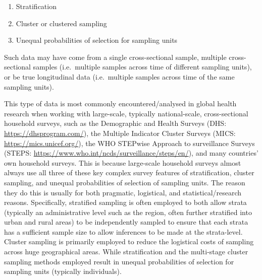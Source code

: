 \documentclass[
]{book}
\begin{document}
\begin{enumerate}
\def\labelenumi{\arabic{enumi}.}
\item
  Stratification
\item
  Cluster or clustered sampling
\item
  Unequal probabilities of selection for sampling units
\end{enumerate}

Such data may have come from a single cross-sectional sample, multiple cross-sectional samples (i.e.~multiple samples across time of different sampling units), or be true longitudinal data (i.e.~multiple samples across time of the same sampling units).

This type of data is most commonly encountered/analysed in global health research when working with large-scale, typically national-scale, cross-sectional household surveys, such as the Demographic and Health Surveys (DHS: \url{https://dhsprogram.com/}), the Multiple Indicator Cluster Surveys (MICS: \url{https://mics.unicef.org/}), the WHO STEPwise Approach to surveillance Surveys (STEPS: \url{https://www.who.int/ncds/surveillance/steps/en/}), and many countries' own household surveys. This is because large-scale household surveys almost always use all three of these key complex survey features of stratification, cluster sampling, and unequal probabilities of selection of sampling units. The reason they do this is usually for both pragmatic, logistical, and statistical/research reasons. Specifically, stratified sampling is often employed to both allow strata (typically an administrative level such as the region, often further stratified into urban and rural areas) to be independently sampled to ensure that each strata has a sufficient sample size to allow inferences to be made at the strata-level. Cluster sampling is primarily employed to reduce the logistical costs of sampling across huge geographical areas. While stratification and the multi-stage cluster sampling methods employed result in unequal probabilities of selection for sampling units (typically individuals).
\end{document}
